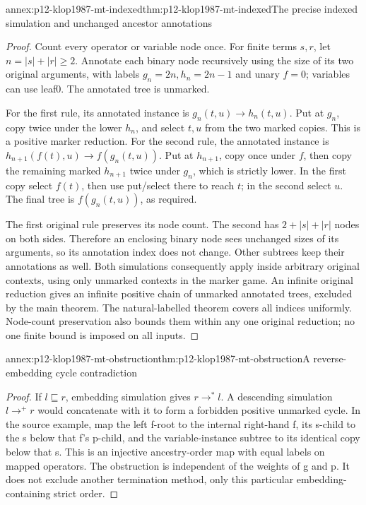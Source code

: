 \begin{annexitem}{annex:p12-klop1987-mt-indexed}{thm:p12-klop1987-mt-indexed}{The precise indexed simulation and unchanged ancestor annotations}
\begin{proof}
Count every operator or variable node once. For finite terms \(s,r\),
let \(n=|s|+|r|\geq2\). Annotate each binary node recursively
using the size of its two original arguments, with labels
\(g_n=2n,h_n=2n-1\) and unary \(f=0\); variables can use
leaf0. The annotated tree is unmarked.

For the first rule, its annotated instance is
\(g_n(t,u)\to h_n(t,u)\). Put at \(g_n\), copy twice under
the lower \(h_n\), and select \(t,u\) from the two marked
copies. This is a positive marker reduction.
For the second rule, the annotated instance is
\(h_{n+1}(f(t),u)\to f(g_n(t,u))\).
Put at \(h_{n+1}\), copy once under \(f\), then copy the
remaining marked \(h_{n+1}\) twice under \(g_n\), which is
strictly lower. In the first copy select \(f(t)\), then use
put/select there to reach \(t\); in the second select \(u\).
The final tree is \(f(g_n(t,u))\), as required.

The first original rule preserves its node count. The second has
\(2+|s|+|r|\) nodes on both sides. Therefore an enclosing binary
node sees unchanged sizes of its arguments, so its annotation index
does not change. Other subtrees keep their annotations as well.
Both simulations consequently apply inside arbitrary original
contexts, using only unmarked contexts in the marker game. An
infinite original reduction gives an infinite positive chain of
unmarked annotated trees, excluded by the main theorem. The
natural-labelled theorem covers all indices uniformly. Node-count
preservation also bounds them within any one original reduction;
no one finite bound is imposed on all inputs.
\end{proof}
\end{annexitem}

\begin{annexitem}{annex:p12-klop1987-mt-obstruction}{thm:p12-klop1987-mt-obstruction}{A reverse-embedding cycle contradiction}
\begin{proof}
If \(l\sqsubseteq r\), embedding simulation gives \(r\to^*l\).
A descending simulation \(l\to^+r\) would concatenate with it
to form a forbidden positive unmarked cycle. In the source example,
map the left f-root to the internal right-hand f, its s-child to the
s below that f's p-child, and the variable-instance subtree to its
identical copy below that s. This is an injective ancestry-order map
with equal labels on mapped operators. The obstruction is independent
of the weights of g and p. It does not exclude another termination
method, only this particular embedding-containing strict order.
\end{proof}
\end{annexitem}
